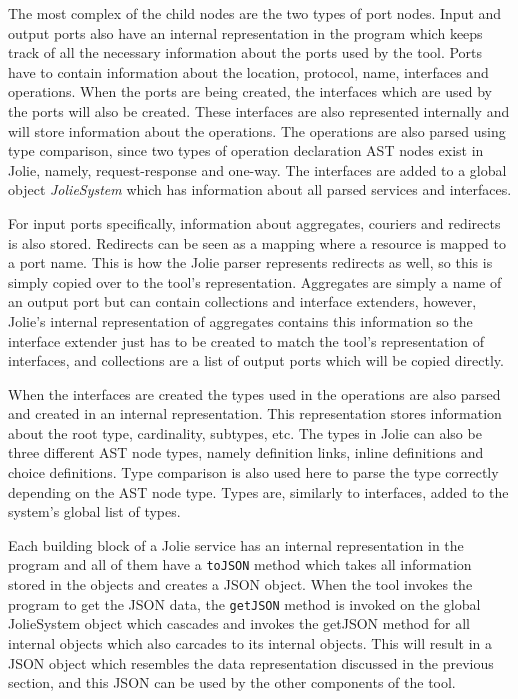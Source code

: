 The most complex of the child nodes are the two types of port nodes. Input and output ports also have an internal representation in the \javatoolname[] program which keeps track of all the necessary information about the ports used by the tool.
Ports have to contain information about the location, protocol, name, interfaces and operations.
When the ports are being created, the interfaces which are used by the ports will also be created. These interfaces are also represented internally and will store information about the operations.
The operations are also parsed using type comparison, since two types of operation declaration AST nodes exist in Jolie, namely, request-response and one-way.
The interfaces are added to a global object \textit{JolieSystem} which has information about all parsed services and interfaces.

For input ports specifically, information about aggregates, couriers and redirects is also stored. Redirects can be seen as a mapping where a resource is mapped to a port name. This is how the Jolie parser represents redirects as well, so this is simply copied over to the tool's representation.
Aggregates are simply a name of an output port but can contain collections and interface extenders, however, Jolie's internal representation of aggregates contains this information so the interface extender just has to be created to match the tool's representation of interfaces, and collections are a list of output ports which will be copied directly.

When the interfaces are created the types used in the operations are also parsed and created in an internal representation.
This representation stores information about the root type, cardinality, subtypes, etc.
The types in Jolie can also be three different AST node types, namely definition links, inline definitions and choice definitions. Type comparison is also used here to parse the type correctly depending on the AST node type.
Types are, similarly to interfaces, added to the system's global list of types.

Each building block of a Jolie service has an internal representation in the \javatoolname[] program and all of them have a \texttt{toJSON} method which takes all information stored in the objects and creates a JSON object.
When the tool invokes the \javatoolname[] program to get the JSON data, the \texttt{getJSON} method is invoked on the global JolieSystem object which cascades and invokes the getJSON method for all internal objects which also carcades to its internal objects.
This will result in a JSON object which resembles the data representation discussed in the previous section, and this JSON can be used by the other components of the tool.

